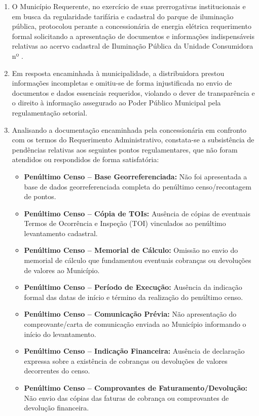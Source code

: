 \begin{enumerate}[resume]
\item O Município Requerente, no exercício de suas prerrogativas institucionais e em busca da regularidade tarifária e cadastral do parque de iluminação pública, protocolou perante a concessionária de energia elétrica requerimento formal solicitando a apresentação de documentos e informações indispensáveis relativas ao acervo cadastral de Iluminação Pública da Unidade Consumidora nº \unidadeConsumidora{}.

\item Em resposta encaminhada à municipalidade, a distribuidora prestou informações incompletas e omitiu-se de forma injustificada no envio de documentos e dados essenciais requeridos, violando o dever de transparência e o direito à informação assegurado ao Poder Público Municipal pela regulamentação setorial.

\item Analisando a documentação encaminhada pela concessionária em confronto com os termos do Requerimento Administrativo, constata-se a subsistência de pendências relativas aos seguintes pontos regulamentares, que não foram atendidos ou respondidos de forma satisfatória:

\begin{itemize}
    \ifItemPenultimoBaseGeorreferenciada\else
        \item \textbf{Penúltimo Censo – Base Georreferenciada:} Não foi apresentada a base de dados georreferenciada completa do penúltimo censo/recontagem de pontos.
    \fi
    \ifItemPenultimoTOI\else
        \item \textbf{Penúltimo Censo – Cópia de TOIs:} Ausência de cópias de eventuais Termos de Ocorrência e Inspeção (TOI) vinculados ao penúltimo levantamento cadastral.
    \fi
    \ifItemPenultimoMemorialCalculo\else
        \item \textbf{Penúltimo Censo – Memorial de Cálculo:} Omissão no envio do memorial de cálculo que fundamentou eventuais cobranças ou devoluções de valores ao Município.
    \fi
    \ifItemPenultimoDatasCenso\else
        \item \textbf{Penúltimo Censo – Período de Execução:} Ausência da indicação formal das datas de início e término da realização do penúltimo censo.
    \fi
    \ifItemPenultimoCartaComunicacao\else
        \item \textbf{Penúltimo Censo – Comunicação Prévia:} Não apresentação do comprovante/carta de comunicação enviada ao Município informando o início do levantamento.
    \fi
    \ifItemPenultimoCobrancaDevolucao\else
        \item \textbf{Penúltimo Censo – Indicação Financeira:} Ausência de declaração expressa sobre a existência de cobranças ou devoluções de valores decorrentes do censo.
    \fi
    \ifItemPenultimoComprovantes\else
        \item \textbf{Penúltimo Censo – Comprovantes de Faturamento/Devolução:} Não envio das cópias das faturas de cobrança ou comprovantes de devolução financeira.
    \fi


\end{itemize}
\end{enumerate}
